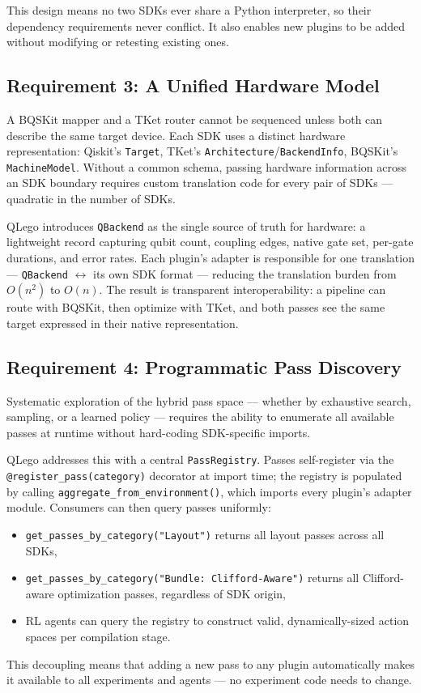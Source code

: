 \documentclass[conference]{IEEEtran}
\begin{document}
This design means no two SDKs ever share a Python interpreter, so their dependency requirements never conflict.
It also enables new plugins to be added without modifying or retesting existing ones.

\subsection{Requirement 3: A Unified Hardware Model}
\label{subsec:hardware}

A BQSKit mapper and a TKet router cannot be sequenced unless both can describe the same target device.
Each SDK uses a distinct hardware representation: Qiskit's \texttt{Target}, TKet's \texttt{Architecture}/\texttt{BackendInfo}, BQSKit's \texttt{MachineModel}.
Without a common schema, passing hardware information across an SDK boundary requires custom translation code for every pair of SDKs — quadratic in the number of SDKs.

QLego introduces \texttt{QBackend} as the single source of truth for hardware: a lightweight record capturing qubit count, coupling edges, native gate set, per-gate durations, and error rates.
Each plugin's adapter is responsible for one translation — \texttt{QBackend} $\leftrightarrow$ its own SDK format — reducing the translation burden from $O(n^2)$ to $O(n)$.
The result is transparent interoperability: a pipeline can route with BQSKit, then optimize with TKet, and both passes see the same target expressed in their native representation.

\subsection{Requirement 4: Programmatic Pass Discovery}
\label{subsec:registry}

Systematic exploration of the hybrid pass space — whether by exhaustive search, sampling, or a learned policy — requires the ability to enumerate all available passes at runtime without hard-coding SDK-specific imports.

QLego addresses this with a central \texttt{PassRegistry}.
Passes self-register via the \texttt{@register\_pass(category)} decorator at import time; the registry is populated by calling \texttt{aggregate\_from\_environment()}, which imports every plugin's adapter module.
Consumers can then query passes uniformly:
\begin{itemize}[nosep]
    \item \texttt{get\_passes\_by\_category("Layout")} returns all layout passes across all SDKs,
    \item \texttt{get\_passes\_by\_category("Bundle: Clifford-Aware")} returns all Clifford-aware optimization passes, regardless of SDK origin,
    \item RL agents can query the registry to construct valid, dynamically-sized action spaces per compilation stage.
\end{itemize}
This decoupling means that adding a new pass to any plugin automatically makes it available to all experiments and agents — no experiment code needs to change.
\end{document}
